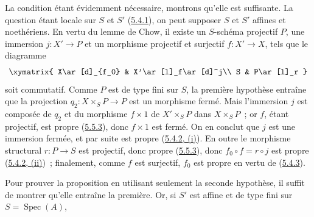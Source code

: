 La condition étant évidemment nécessaire, montrons qu'elle est suffisante.
La question étant locale sur $S$ et $S'$ (\hyperref[II.5.4.1-fr]{5.4.1}), on
peut supposer $S$ et $S'$ affines et noethériens. En vertu du lemme de Chow,
il existe un $S$-schéma projectif $P$, une immersion $j:X'\to P$ et un
morphisme projectif et surjectif $f:X'\to X$, tels que le diagramme
\[
\xymatrix{
X\ar[d]_{f_0} & X'\ar[l]_f\ar[d]^j\\
S & P\ar[l]_r
}
\]
soit commutatif. Comme $P$ est de type fini sur $S$, la première hypothèse
entraîne que la projection $q_2:X\times_SP\to P$ est un morphisme fermé. Mais
l'immersion $j$ est composée de $q_2$ et du morphisme $f\times1$ de
$X'\times_SP$ dans $X\times_SP$~; or $f$, étant projectif, est propre
(\hyperref[II.5.5.3-fr]{5.5.3}), donc $f\times1$ est fermé. On en conclut que
$j$ est une immersion fermée, et par suite est propre
(\hyperref[II.5.4.2-fr]{5.4.2, (i)}). En outre le morphisme structural
$r:P\to S$ est projectif, donc propre (\hyperref[II.5.5.3-fr]{5.5.3}), donc
$f_0\circ f=r\circ j$ est propre
(\hyperref[II.5.4.2-fr]{5.4.2, (ii)})~; finalement, comme $f$ est surjectif,
$f_0$ est propre en vertu de (\hyperref[II.5.4.3-fr]{5.4.3}).

Pour prouver la proposition en utilisant seulement la seconde hypothèse, il
suffit de montrer qu'elle entraîne la première. Or, si $S'$ est affine et de
type fini sur $S=\operatorname{Spec}(A)$,

